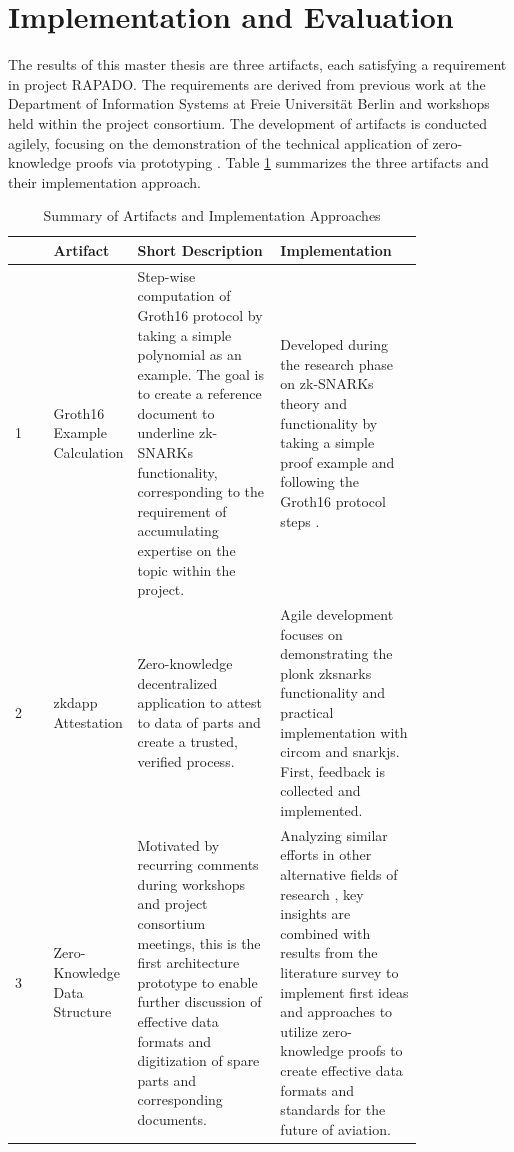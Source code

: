 \section{Implementation and Evaluation}
The results of this master thesis are three artifacts, each satisfying a requirement in project RAPADO. The requirements are derived from previous work at the Department of Information Systems at Freie Universit{\"a}t Berlin and workshops held within the project consortium. The development of artifacts is conducted agilely, focusing on the demonstration of the technical application of zero-knowledge proofs via prototyping \citep{mci/Wilde2007}. Table \ref{tab:summary_artifacts} summarizes the three artifacts and their implementation approach.
\setlength{\tabcolsep}{2ex}
\renewcommand{\arraystretch}{1.5}%
\begin{table}[htb]
	\centering
	    \caption{Summary of Artifacts and Implementation Approaches}
		\begin{tabular}{|m{0.001\linewidth} | m{0.11\linewidth} | m{0.35\linewidth} | m{0.35\linewidth} |}
		\hline
		\textbf{}& \textbf{Artifact} & \textbf{Short Description} & \textbf{Implementation} \\ \hline
            1&Groth16 Example \newline Calculation & Step-wise computation of Groth16 protocol by taking a simple polynomial as an example. The goal is to create a reference document to underline zk-SNARKs functionality, corresponding to the requirement of accumulating expertise on the topic within the project. & Developed during the research phase on zk-SNARKs theory and functionality by taking a simple proof example and following the Groth16 protocol steps \citep{Groth2016OnTS}. \\  \hline
            2&\acrshort{zkdapp}  \newline Attestation & Zero-knowledge decentralized application to attest to  data of parts and create a trusted, verified process. & Agile development focuses on demonstrating the \acrshort{plonk} \acrshort{zksnark}s functionality and practical implementation with circom and snarkjs. First, feedback is collected and implemented. \\ \hline 
            3&Zero-Knowledge Data \newline Structure & Motivated by recurring comments during workshops and project consortium meetings, this is the first architecture prototype to enable further discussion of effective data formats and digitization of spare parts and corresponding documents. & Analyzing similar efforts in other alternative fields of research \citep{sedlemeirgrenenergy}, key insights are combined with results from the literature survey to implement first ideas and approaches to utilize zero-knowledge proofs to create effective data formats and standards for the future of aviation. \\ \hline 
	\end{tabular}
\label{tab:summary_artifacts}
\end{table}

